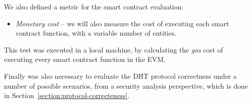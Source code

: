 \begin{table}[h!]
\centering
{}
\caption{Test scenarios.}
\label{table:test-scenarios}
\end{table}

We also defined a metric for the smart contract evaluation:

\begin{itemize}
  \item \textit{Monetary cost} – we will also measure the cost of executing each smart contract function, with a variable number of entities.
\end{itemize}

This test was executed in a local machine, by calculating the \textit{gas} cost of executing every smart contract function in the \ac{EVM}.

Finally was also necessary to evaluate the DHT protocol correctness under a number of possible scenarios, from a security analysis perspective, which is done in Section~\ref{section:protocol-correcteness}.

